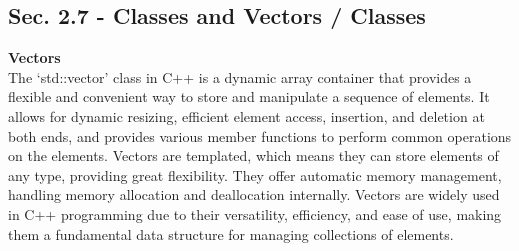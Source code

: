 \subsection*{Sec. 2.7 - Classes and Vectors / Classes}
\noindent \textbf{Vectors} \\

The `std::vector' class in C++ is a dynamic array container that provides a flexible and convenient way to store and manipulate a sequence of elements. It allows for dynamic resizing, efficient element access, insertion, and deletion 
at both ends, and provides various member functions to perform common operations on the elements. Vectors are templated, which means they can store elements of any type, providing great flexibility. They offer automatic memory management, 
handling memory allocation and deallocation internally. Vectors are widely used in C++ programming due to their versatility, efficiency, and ease of use, making them a fundamental data structure for managing collections of elements. \\

